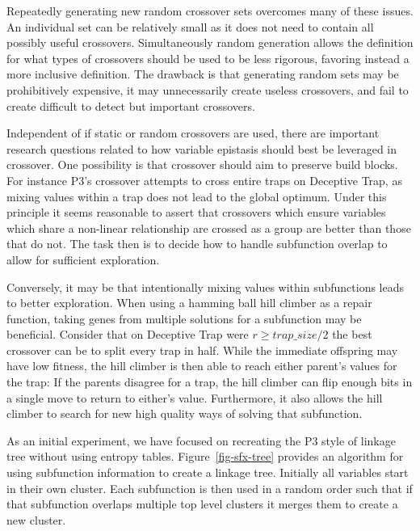 Repeatedly generating new random crossover sets overcomes many of these issues. An individual set can be relatively small
as it does not need to contain all possibly useful crossovers. Simultaneously random generation allows the definition for
what types of crossovers should be used to be less rigorous, favoring instead a more inclusive definition. The drawback
is that generating random sets may be prohibitively expensive, it may unnecessarily create useless crossovers, and fail
to create difficult to detect but important crossovers.

Independent of if static or random crossovers are used, there are important research questions related to how variable epistasis
should best be leveraged in crossover. One possibility is that crossover should aim to preserve build blocks. For instance P3's
crossover attempts to cross entire traps on Deceptive Trap, as mixing values within a trap does not lead to the global optimum.
Under this principle it seems reasonable to assert that crossovers which ensure variables which share a non-linear relationship
are crossed as a group are better than those that do not. The task then is to decide how to handle subfunction overlap to allow
for sufficient exploration.

Conversely, it may be that intentionally mixing values within subfunctions leads to better exploration. When using a hamming
ball hill climber as a repair function, taking genes from multiple solutions for a subfunction may be beneficial. Consider
that on Deceptive Trap were $r\geq trap\_size/2$ the best crossover can be to split every trap in half. While the immediate
offspring may have low fitness, the hill climber is then able to reach either parent's values for the trap: If the parents
disagree for a trap, the hill climber can flip enough bits in a single move to return to either's value. Furthermore, it
also allows the hill climber to search for new high quality ways of solving that subfunction.

As an initial experiment, we have focused on recreating the P3 style of linkage tree without using entropy tables.
Figure~\ref{fig-sfx-tree} provides an algorithm for using subfunction information to create a linkage tree.
Initially all variables start in their own cluster. Each subfunction is then used in a random order such that
if that subfunction overlaps multiple top level clusters it merges them to create a new cluster.

